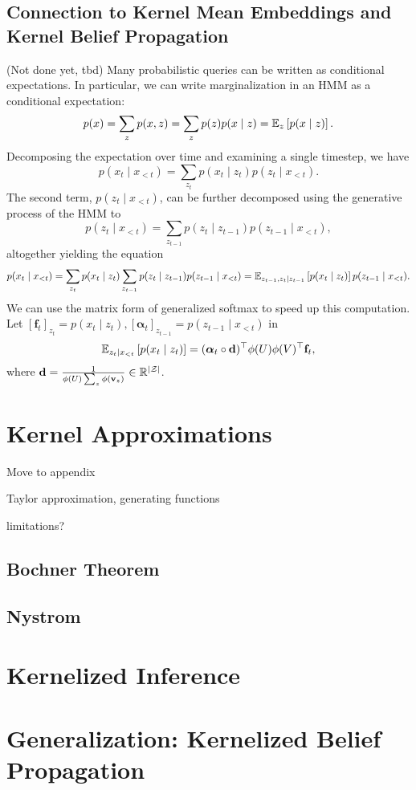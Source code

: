 \documentclass{article}
\begin{document}
\subsection{Connection to Kernel Mean Embeddings and Kernel Belief Propagation}
(Not done yet, tbd)
Many probabilistic queries can be written as conditional expectations.
In particular, we can write marginalization in an HMM as a conditional expectation:
$$p(x) = \sum_z p(x,z) = \sum_z p(z)p(x \mid z) = \mathbb{E}_{z}\left[p(x \mid z)\right].$$
Decomposing the expectation over time and examining a single timestep, we have
$$p(x_t \mid x_{<t})
= \sum_{z_t}p(x_t\mid z_t)p(z_t \mid x_{<t}).
$$
The second term, $p(z_t \mid x_{<t})$,
can be further decomposed using the generative process of the HMM to
$$
 p(z_t \mid x_{<t}) = \sum_{z_{t-1}}p(z_t \mid z_{t-1})p(z_{t-1} \mid x_{<t}),
$$
altogether yielding the equation
$$
p(x_t \mid x_{<t})
= \sum_{z_t} p(x_t \mid z_t)\sum_{z_{t-1}}p(z_t \mid z_{t-1})p(z_{t-1} \mid x_{<t})
= \mathbb{E}_{z_{t-1},z_t\mid z_{t-1}}\left[p(x_t \mid z_t)\right]p(z_{t-1}\mid x_{<t}).
$$
We can use the matrix form of generalized softmax to speed up this computation.
Let $[\mathbf{f}_t]_{z_t} = p(x_t\mid z_t), [\bm\alpha_t]_{z_{t-1}} = p(z_{t-1}\mid x_{<t})$ in
$$\mathbb{E}_{z_t\mid x_{<t}}\left[p(x_t\mid z_t)\right]=(\bm\alpha_t\circ \mathbf{d})^\top\phi(U)\phi(V)^\top\mathbf{f}_t,$$
where $\mathbf{d} = \frac{1}{\phi(U)\sum_z\phi(\mathbf{v}_z)}\in\mathbb{R}^{|\mathcal{Z}|}$.


\section{Kernel Approximations}
Move to appendix

Taylor approximation, generating functions

limitations?
\subsection{Bochner Theorem}
\subsection{Nystrom}

\section{Kernelized Inference}

\section{Generalization: Kernelized Belief Propagation}
\end{document}
